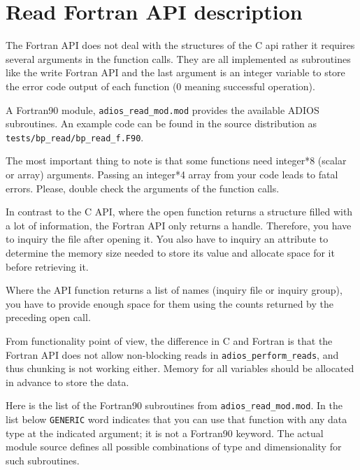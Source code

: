 \section{Read Fortran API description}
\label{section:read_fortran_api}

The Fortran API does not deal with the structures of the C api rather it requires 
several arguments in the function calls.  They are all implemented as subroutines 
like the write Fortran API and the last argument is an integer variable to store 
the error code output of each function (0 meaning successful operation). 

A Fortran90 module, \verb+adios_read_mod.mod+ provides the available ADIOS subroutines. 
An example code can be found in the source distribution as 
\verb+tests/bp_read/bp_read_f.F90+.

The most important thing to note is that some functions need integer*8 (scalar 
or array) arguments. Passing an integer*4 array from your code leads to fatal errors. 
Please, double check the arguments of the function calls. 

In contrast to the C API, where the open function returns a structure filled with 
a lot of information, the Fortran API only returns a handle. Therefore, 
you have to inquiry the file after opening it.
You also have to inquiry an attribute to determine the memory 
size needed to store its value and allocate space for it before retrieving it. 

Where the API function returns a list of names (inquiry file or inquiry group), 
you have to provide enough space for them using the counts returned by the preceding 
open call. 

From functionality point of view, the difference in C and Fortran is that the 
Fortran API does not allow non-blocking reads in \verb+adios_perform_reads+, and thus
chunking is not working either. Memory for all variables should be allocated in advance 
to store the data.

Here is the list of the Fortran90 subroutines from \verb+adios_read_mod.mod+. 
In the list below \verb+GENERIC+ word indicates that you 
can use that function with any data type at the indicated argument; it is not
a Fortran90 keyword. The actual module source defines all possible combinations 
of type and dimensionality for such subroutines. 

